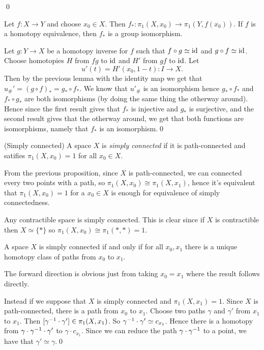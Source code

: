 \documentclass{article}
\begin{document}
\qed
\par
\begin{theorem}
	Let $ f: X\to Y $ and choose $ x_0\in X $. Then $ f_*: \pi_1(X,x_0) \to \pi_1(Y,f(x_0)) $. If $ f $ is a homotopy equivalence, then $ f_* $ is a group isomorphism. 
\end{theorem}
\pf Let $ g:Y \to X $ be a homotopy inverse for $ f $ such that $ f\circ g\simeq \mathrm{id} $ and $ g\circ f \simeq \mathrm{id} $. Choose homotopies $ H $ from $ fg $ to $ \mathrm{id} $ and $ H' $ from $ gf $ to $ \mathrm{id} $. Let 
\[
  u'(t) = H'(x_0,1-t): I \to X.
\]
Then by the previous lemma with the identity map we get that $ u_\#' = (g\circ f)_* = g_* \circ f_* $. We know that $ u'_\# $ is an isomorphism hence $ g_* \circ f_* $ and $ f_*\circ g_* $ are both isomorphisms (by doing the same thing the otherway around). Hence since the first result gives that $ f_* $ is injective and $ g_* $ is surjective, and the second result gives that the otherway around, we get that both functions are isomorphisms, namely that $ f_* $ is an isomorphism.\qed
\begin{definition}
	(Simply connected) A space $ X $ is \textit{simply connected} if it is path-connected and satifies $ \pi_1(X,x_0) = 1 $ for all $ x_0\in X $.
\end{definition}
\begin{remark}
  From the previous proposition, since $ X $ is path-connected, we can connected every two points with a path, so $ \pi_1(X,x_0) \cong \pi_1(X,x_1) $, hence it's equivalent that $ \pi_1(X,x_0) =1 $ for a $ x_0\in X $ is enough for equivalence of simply connectedness.
\end{remark}
\begin{example}
	Any contractible space is simply connected. This is clear since if $ X $ is contractible then $ X\simeq \{*\} $ so $ \pi_1(X,x_0)\cong \pi_1(*,*) = 1 $.
\end{example}
\begin{lemma}
  A space $ X $ is simply connected if and only if for all $ x_0,x_1 $ there is a unique homotopy class of paths from $ x_0 $ to $ x_1 $.
\end{lemma}
\pf The forward direction is obvious just from taking $ x_0 = x_1 $ where the result follows directly.\par
Instead if we suppose that $ X $ is simply connected and $ \pi_1(X,x_1) = 1 $. Since $ X $ is path-connected, there is a path from $ x_0 $ to $ x_1 $. Choose two paths $ \gamma $ and $ \gamma' $ from $ x_1 $ to $ x_1 $. Then $ [{\gamma}^{-1} \cdot \gamma']\in \pi_1(X,x_1) $. So $ {\gamma}^{-1}\cdot \gamma'\simeq c_{x_1} $. Hence there is a homotopy from $ \gamma \cdot {\gamma}^{-1} \cdot \gamma' $ to $ \gamma \cdot c_{x_1}	$. Since we can reduce the path $ \gamma \cdot {\gamma}^{-1} $ to a point, we have that $ \gamma' \simeq \gamma $.\qed
\end{document}
